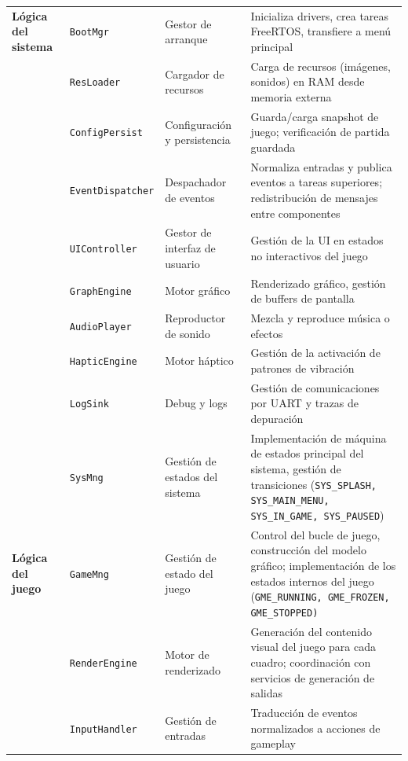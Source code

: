 \documentclass[11pt,a4paper]{article}
\begin{document}
\begin{longtable}{|p{2cm}|l|p{3cm}|p{6.5cm}|}
\textbf{Lógica del sistema} & \texttt{BootMgr} & Gestor de arranque & Inicializa drivers, crea tareas FreeRTOS, transfiere a menú principal \\
\cline{2-4}
& \texttt{ResLoader} & Cargador de recursos & Carga de recursos (imágenes, sonidos) en RAM desde memoria externa \\
\cline{2-4}
& \texttt{ConfigPersist} & Configuración y persistencia & Guarda/carga snapshot de juego; verificación de partida guardada \\
\cline{2-4}
& \texttt{EventDispatcher} & Despachador de eventos & Normaliza entradas y publica eventos a tareas superiores; redistribución de mensajes entre componentes \\
\cline{2-4}
& \texttt{UIController} & Gestor de interfaz de usuario & Gestión de la UI en estados no interactivos del juego \\
\cline{2-4}
& \texttt{GraphEngine} & Motor gráfico & Renderizado gráfico, gestión de buffers de pantalla \\
\cline{2-4}
& \texttt{AudioPlayer} & Reproductor de sonido & Mezcla y reproduce música o efectos \\
\cline{2-4}
& \texttt{HapticEngine} & Motor háptico & Gestión de la activación de patrones de vibración \\
\cline{2-4}
& \texttt{LogSink} & Debug y logs & Gestión de comunicaciones por UART y trazas de depuración \\
\cline{2-4}
& \texttt{SysMng} & Gestión de estados del sistema & Implementación de máquina de estados principal del sistema,
gestión de transiciones (\texttt{SYS\_SPLASH, SYS\_MAIN\_MENU, SYS\_IN\_GAME, SYS\_PAUSED}) \\
\hline

\textbf{Lógica del juego} & \texttt{GameMng} & Gestión de estado del juego & Control del bucle de juego, construcción del modelo
gráfico; implementación de los estados internos del juego (\texttt{GME\_RUNNING, GME\_FROZEN, GME\_STOPPED)} \\
\cline{2-4}
& \texttt{RenderEngine} & Motor de renderizado & Generación del contenido visual del juego para cada cuadro; coordinación con servicios de generación de salidas \\
\cline{2-4}
& \texttt{InputHandler} & Gestión de entradas & Traducción de eventos normalizados a acciones de gameplay \\
\cline{2-4}
\end{longtable}


\end{document}
